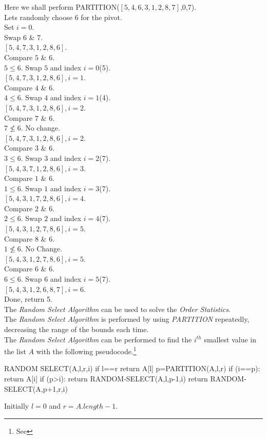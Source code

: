 \documentclass[11pt,a4paper]{article}
\begin{document}
Here we shall perform PARTITION($[5,4,6,3,1,2,8,7]$,0,7).\\
Lets randomly choose $6$ for the pivot.\\
Set $i=0$.\\
Swap $6$ \& $7$.\\
$[5,4,7,3,1,2,8,6]$.\\
Compare $5$ \& $6$.\\
$5\leq 6$. Swap $5$ and index $i=0$(5).\\
$[5,4,7,3,1,2,8,6], i=1$.\\
Compare $4$ \& $6$.\\
$4\leq 6$. Swap $4$ and index $i=1$(4).\\
$[5,4,7,3,1,2,8,6], i=2$.\\
Compare $7$ \& $6$.\\
$7\not\leq 6$. No change.\\
$[5,4,7,3,1,2,8,6], i=2$.\\
Compare $3$ \& $6$.\\
$3\leq 6$. Swap $3$ and index $i=2$(7).\\
$[5,4,3,7,1,2,8,6], i=3$.\\
Compare $1$ \& $6$.\\
$1\leq 6$. Swap $1$ and index $i=3$(7).\\
$[5,4,3,1,7,2,8,6], i=4$.\\
\newpage
Compare $2$ \& $6$.\\
$2\leq 6$. Swap $2$ and index $i=4$(7).\\
$[5,4,3,1,2,7,8,6], i=5$.\\
Compare $8$ \& $6$.\\
$1\not\leq 6$. No Change.\\
$[5,4,3,1,2,7,8,6], i=5$.\\
Compare $6$ \& $6$.\\
$6\leq 6$. Swap $6$ and index $i=5$(7).\\
$[5,4,3,1,2,6,8,7], i=6$.\\
Done, return 5.\\

The \textit{Random Select Algorithm} can be used to solve the \textit{Order Statistics}.\\
The \textit{Random Select Algorithm} is performed by using \textit{PARTITION} repeatedly, decreasing the range of the bounds each time.\\
The \textit{Random Select Algorithm} can be performed to find the $i^{th}$ smallest value in the list $A$ with the following pseudocode.\footnote{See }
\begin{code}
RANDOM SELECT(A,l,r,i)
if l==r
  return A[l]
p=PARTITION(A,l,r)
if (i==p):
  return A[i]
if (p>i):
  return RANDOM-SELECT(A,l,p-1,i)
return RANDOM-SELECT(A,p+1,r,i)
\end{code}
\nb Initially $l=0$ and $r=A.length-1$.\\
\end{document}
